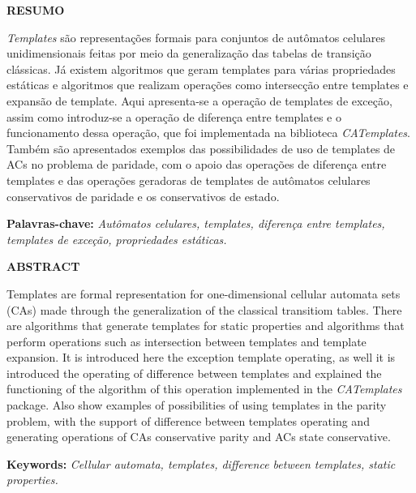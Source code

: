 \newpage
\thispagestyle{plain}
\begin{center}
\large
\textbf{RESUMO}
\end{center}
\textit{Templates} são representações formais para conjuntos de autômatos celulares unidimensionais feitas por meio da generalização das tabelas de transição clássicas. Já existem algoritmos que geram templates para várias propriedades estáticas e algoritmos que realizam operações como intersecção entre templates e expansão de template. Aqui apresenta-se a operação de templates de exceção, assim como introduz-se a operação de diferença entre templates e o funcionamento dessa operação, que foi implementada na biblioteca \textit{CATemplates}. Também são apresentados exemplos das possibilidades de uso de templates de ACs no problema de paridade, com o apoio das operações de diferença entre templates e das operações geradoras de templates de autômatos celulares conservativos de paridade e os conservativos de estado.
\\[0.5cm]
\begin{flushleft}
{\bf Palavras-chave:} {\it Autômatos celulares, templates, diferença entre templates, templates de exceção, propriedades estáticas.}
\end{flushleft}


\newpage
\thispagestyle{plain}
\begin{center}
\large  
\textbf{ABSTRACT}
\end{center}
Templates are formal representation for one-dimensional cellular automata sets (CAs) made through the generalization of the classical transitiom tables. There are algorithms that generate templates for static properties and algorithms that perform operations such as intersection between templates and template expansion. It is introduced here the exception template operating, as well it is introduced the operating of difference between templates and explained the functioning of the algorithm of this operation implemented in the \textit{CATemplates} package. Also show examples of possibilities of using templates in the parity problem, with the support of difference between templates operating and generating operations of CAs conservative parity and ACs state conservative.
\\[0.5cm]
\begin{flushleft}
{\bf Keywords:} {\it Cellular automata, templates, difference between templates, static properties.}
\end{flushleft}